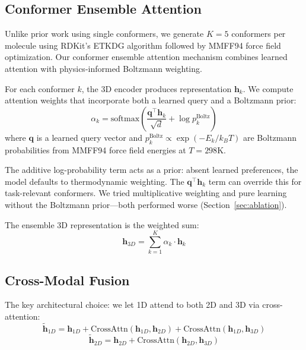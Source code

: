 \documentclass[11pt]{article}
\begin{document}
\subsection{Conformer Ensemble Attention}

Unlike prior work using single conformers, we generate $K=5$ conformers per molecule using RDKit's ETKDG algorithm \citep{riniker2015better} followed by MMFF94 force field optimization. Our conformer ensemble attention mechanism combines learned attention with physics-informed Boltzmann weighting.

For each conformer $k$, the 3D encoder produces representation $\mathbf{h}_k$. We compute attention weights that incorporate both a learned query and a Boltzmann prior:
\begin{equation}
    \alpha_k = \text{softmax}\left( \frac{\mathbf{q}^\top \mathbf{h}_k}{\sqrt{d}} + \log p_k^{\text{Boltz}} \right)
\end{equation}
where $\mathbf{q}$ is a learned query vector and $p_k^{\text{Boltz}} \propto \exp(-E_k / k_B T)$ are Boltzmann probabilities from MMFF94 force field energies at $T = 298$K.

The additive log-probability term acts as a prior: absent learned preferences, the model defaults to thermodynamic weighting. The $\mathbf{q}^\top \mathbf{h}_k$ term can override this for task-relevant conformers. We tried multiplicative weighting and pure learning without the Boltzmann prior---both performed worse (Section~\ref{sec:ablation}).

The ensemble 3D representation is the weighted sum:
\begin{equation}
    \mathbf{h}_{3D} = \sum_{k=1}^{K} \alpha_k \cdot \mathbf{h}_k
\end{equation}

\subsection{Cross-Modal Fusion}

The key architectural choice: we let 1D attend to both 2D and 3D via cross-attention:
\begin{equation}
    \tilde{\mathbf{h}}_{1D} = \mathbf{h}_{1D} + \text{CrossAttn}(\mathbf{h}_{1D}, \mathbf{h}_{2D}) + \text{CrossAttn}(\mathbf{h}_{1D}, \mathbf{h}_{3D})
\end{equation}
\begin{equation}
    \tilde{\mathbf{h}}_{2D} = \mathbf{h}_{2D} + \text{CrossAttn}(\mathbf{h}_{2D}, \mathbf{h}_{3D})
\end{equation}
\end{document}
